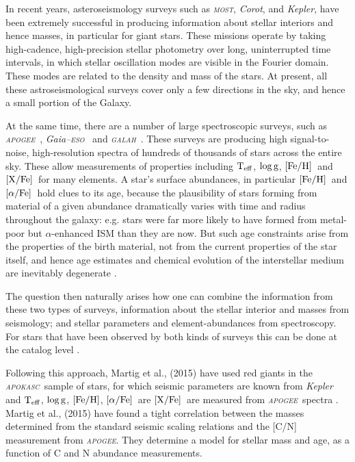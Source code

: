 \documentclass[12pt, preprint]{aastex}
\newcommand{\project}[1]{\textsl{#1}}
\newcommand{\apogee}{\project{\textsc{apogee}}}
\newcommand{\apokasc}{\project{\textsc{apokasc}}}
\newcommand{\corot}{\project{Corot}}
\newcommand{\kepler}{\project{Kepler}}
\newcommand{\gaiaeso}{\project{Gaia--\textsc{eso}}}
\newcommand{\galah}{\project{\textsc{galah}}}
\newcommand{\most}{\project{\textsc{most}}}
\newcommand{\teff}{\mbox{$\rm T_{eff}$}}
\newcommand{\feh}{\mbox{$\rm [Fe/H]$}}
\newcommand{\xfe}{\mbox{$\rm [X/Fe]$}}
\newcommand{\alphafe}{\mbox{$\rm [\alpha/Fe]$}}
\newcommand{\logg}{\mbox{$\rm \log g$}}
\begin{document}
In recent years, asteroseismology surveys such as \most, \corot, and \kepler, have
been extremely successful in producing information
about stellar interiors and hence masses, in particular for giant stars. 
These missions operate by taking high-cadence, high-precision stellar
photometry over long, uninterrupted time intervals, in which stellar oscillation 
modes are visible in the Fourier domain. These modes are related to the density and mass of the stars.
At present, all these astroseismological surveys cover only a few directions in the sky, and hence a small portion of the Galaxy.

At the same time, there are a number of large spectroscopic surveys, such
as \apogee\ \citep{Majewski2012}, \gaiaeso\ \citep{Gilmore2012} and \galah\ \citep{Freeman2012}. These surveys are 
producing high signal-to-noise, high-resolution spectra
of hundreds of thousands of stars across the entire sky. These allow measurements of properties including \teff, \logg, \feh\ and \xfe\ for many elements. A star's surface abundances, in particular \feh\ and \alphafe\ hold clues to its age, because the plausibility of stars forming from material of a given abundance dramatically varies with time and radius throughout the galaxy: e.g. stars 
were far more likely to have formed from metal-poor but $\alpha$-enhanced ISM than they are now. But such age constraints arise from the properties of the birth material, not from the current properties of the star itself, and hence age estimates and chemical evolution of the interstellar medium are inevitably degenerate \citep[see e.g.,][]{Schonrich2009, Ch2002}.

The question then naturally arises how one can combine the information from these two types of surveys, information about the stellar interior and masses from seismology; and
stellar parameters and element-abundances from spectroscopy. For stars that have been observed by both kinds of surveys this can be done at the catalog level \citep{Martig2014}.

Following this approach, Martig et al., (2015) have used red giants in the \apokasc\ sample of stars, for which seismic parameters are known from \kepler\ \citep{P2014} and \teff, \logg, \feh, \alphafe\  are \xfe\ are measured from \apogee\ spectra \citep{Ahn2014}. Martig et al., (2015) have found a tight correlation between the masses determined from the standard seismic scaling relations and the [C/N] measurement from \apogee.  They determine a model for stellar mass and age, as a function of C and N abundance measurements. 
\end{document}
